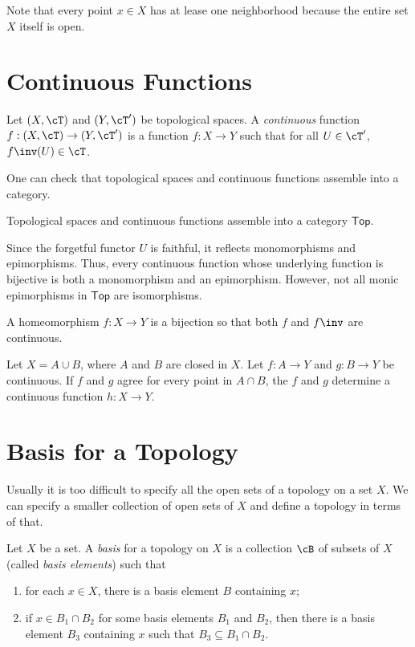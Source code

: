 \documentclass{amsart}
\begin{document}
Note that every point $x \in X$ has at lease one neighborhood because the entire set $X$ itself is open.

\section{Continuous Functions}
\label{sec:continuous-functions}

\begin{defn}
  Let $(X,\cT)$ and $(Y,\cT')$ be topological spaces.
  A \emph{continuous} function $f : (X,\cT) \to (Y,\cT')$ is a function $f : X \to Y$ such that for all $U \in \cT'$, $f\inv(U) \in \cT$.
\end{defn}
One can check that topological spaces and continuous functions assemble into a category.

\begin{lem}
  Topological spaces and continuous functions assemble into a category $\mathsf{Top}$.
\end{lem}

Since the forgetful functor $U$ is faithful, it reflects monomorphisms and epimorphisms.
Thus, every continuous function whose underlying function is bijective is both a monomorphism and an epimorphism.
However, not all monic epimorphisms in $\mathsf{Top}$ are isomorphisms.

\begin{defn}
  A homeomorphism $f : X \to Y$ is a bijection so that both $f$ and $f\inv$ are continuous.
\end{defn}

\begin{lem}
  Let $X = A \cup B$, where $A$ and $B$ are closed in $X$.
  Let $f : A \to Y$ and $g : B \to Y$ be continuous.
  If $f$ and $g$ agree for every point in $A \cap B$, the $f$ and $g$ determine a continuous function $h : X \to Y$.
\end{lem}

\section{Basis for a Topology}
\label{sec:basis-for-a-topology}

Usually it is too difficult to specify all the open sets of a topology on a set $X$.
We can specify a smaller collection of open sets of $X$ and define a topology in terms of that.
\begin{defn}
  Let $X$ be a set.
  A \emph{basis} for a topology on $X$ is a collection $\cB$ of subsets of $X$ (called \emph{basis elements}) such that
  \begin{enumerate}
  \item for each $x \in X$, there is a basis element $B$ containing $x$;
  \item if $x \in B_{1} \cap B_{2}$ for some basis elements $B_{1}$ and $B_{2}$, then there is a basis element $B_{3}$ containing $x$ such that $B_{3} \subseteq B_{1} \cap B_{2}$.
  \end{enumerate}
\end{defn}
\end{document}
